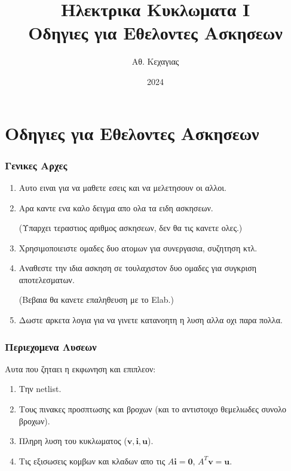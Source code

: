 \documentclass[xcolor={dvipsnames},t]{beamer}
\title[Οδηγιες]{{\small Ηλεκτρικα Κυκλωματα Ι}\\Οδηγιες για Εθελοντες Ασκησεων}
\author[Αθ. Κεχαγιας]{Αθ. Κεχαγιας}
\date[2024]{2024}
\begin{document}
\frame{\titlepage}





\section{Οδηγιες για Εθελοντες Ασκησεων}

\begin{frame}
\frametitle{Γενικες Αρχες}

\begin{enumerate}
\pause\item Αυτο ειναι για να μαθετε εσεις και να μελετησουν οι αλλοι.

\pause\item Αρα καντε ενα καλο δειγμα απο ολα τα ειδη ασκησεων.

\pause (Υπαρχει τεραστιος αριθμος ασκησεων, δεν θα τις κανετε ολες.)

\pause\item Χρησιμοποιειστε ομαδες δυο ατομων για συνεργασια, συζητηση κτλ.

\pause\item Αναθεστε την ιδια ασκηση σε τουλαχιστον δυο ομαδες για συγκριση αποτελεσματων.

\pause (Βεβαια θα κανετε επαληθευση με το {\latintext  Elab}.)

\pause\item Δωστε αρκετα λογια για να γινετε κατανοητη η λυση αλλα οχι παρα πολλα. 

\end{enumerate}

\end{frame}
\begin{frame}
\frametitle{Περιεχομενα Λυσεων}

\pause Αυτα που ζηταει η εκφωνηση και επιπλεον:

\begin{enumerate}

\pause\item Την {\latintext  netlist}.
\pause\item Τους πινακες προσπτωσης και βροχων (και το αντιστοιχο θεμελιωδες συνολο βροχων). 
\pause\item Πληρη λυση του κυκλωματος ($\mathbf{v,i,u}$).
\pause\item Τις εξισωσεις κομβων και κλαδων απο τις $A\mathbf{i}=\mathbf{0}$, 
$A^T\mathbf{v}=\mathbf{u}$.

\end{enumerate}

\end{frame}
\end{document}
